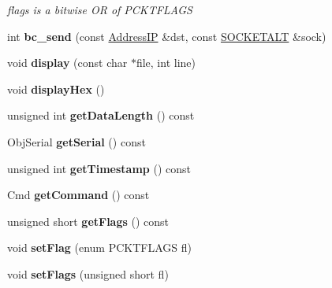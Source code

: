 \begin{DoxyCompactItemize}
\begin{DoxyCompactList}\small\item\em flags is a bitwise OR of P\+C\+K\+T\+F\+L\+A\+GS \end{DoxyCompactList}\item 
int {\bfseries bc\+\_\+send} (const \hyperlink{structAddressIP}{Address\+IP} \&dst, const \hyperlink{classSOCKETALT}{S\+O\+C\+K\+E\+T\+A\+LT} \&sock)\hypertarget{classPacket_a928ae2b7c074dbc19e4a719816186a56}{}\label{classPacket_a928ae2b7c074dbc19e4a719816186a56}

\item 
void {\bfseries display} (const char $\ast$file, int line)\hypertarget{classPacket_a50eaf808a345e4507d53f86b3592ad7d}{}\label{classPacket_a50eaf808a345e4507d53f86b3592ad7d}

\item 
void {\bfseries display\+Hex} ()\hypertarget{classPacket_aee21e28d165e5b6264cc87a1bdc64579}{}\label{classPacket_aee21e28d165e5b6264cc87a1bdc64579}

\item 
unsigned int {\bfseries get\+Data\+Length} () const \hypertarget{classPacket_a0f157750cbc8912d126e1096474a4f4c}{}\label{classPacket_a0f157750cbc8912d126e1096474a4f4c}

\item 
Obj\+Serial {\bfseries get\+Serial} () const \hypertarget{classPacket_a3e96e76927c248688b1cb25f9a974d34}{}\label{classPacket_a3e96e76927c248688b1cb25f9a974d34}

\item 
unsigned int {\bfseries get\+Timestamp} () const \hypertarget{classPacket_aed42c51631f7a786c6bb04d960757761}{}\label{classPacket_aed42c51631f7a786c6bb04d960757761}

\item 
Cmd {\bfseries get\+Command} () const \hypertarget{classPacket_a522dd7890cef9246ce570ca4e92b0f46}{}\label{classPacket_a522dd7890cef9246ce570ca4e92b0f46}

\item 
unsigned short {\bfseries get\+Flags} () const \hypertarget{classPacket_abce53f7fe9d999af89577eaf05e2db1b}{}\label{classPacket_abce53f7fe9d999af89577eaf05e2db1b}

\item 
void {\bfseries set\+Flag} (enum P\+C\+K\+T\+F\+L\+A\+GS fl)\hypertarget{classPacket_abc36f84df785503add60e1017735d3ed}{}\label{classPacket_abc36f84df785503add60e1017735d3ed}

\item 
void {\bfseries set\+Flags} (unsigned short fl)\hypertarget{classPacket_ac5b63b3d30cad3ac8f38c546f76013a0}{}\label{classPacket_ac5b63b3d30cad3ac8f38c546f76013a0}


\end{DoxyCompactItemize}
